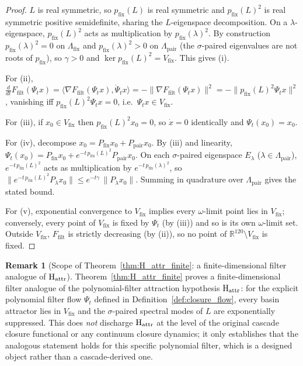 \documentclass[11pt, a4paper]{amsart}
\theoremstyle{definition}
\newtheorem{remark}[theorem]{Remark}
\newcommand{\R}{\mathbb{R}}
\begin{document}
\begin{proof}
$L$ is real symmetric, so $p_{\mathrm{fix}}(L)$ is real symmetric and
$p_{\mathrm{fix}}(L)^2$ is real symmetric positive semidefinite,
sharing the $L$-eigenspace decomposition. On a $\lambda$-eigenspace,
$p_{\mathrm{fix}}(L)^2$ acts as multiplication by
$p_{\mathrm{fix}}(\lambda)^2$. By construction
$p_{\mathrm{fix}}(\lambda)^2 = 0$ on $\Lambda_{\mathrm{fix}}$ and
$p_{\mathrm{fix}}(\lambda)^2 > 0$ on $\Lambda_{\mathrm{pair}}$
(the $\sigma$-paired eigenvalues are not roots of $p_{\mathrm{fix}}$),
so $\gamma > 0$ and $\ker p_{\mathrm{fix}}(L)^2 = V_{\mathrm{fix}}$.
This gives (i).

For (ii), $\frac{d}{dt} F_{\mathrm{filt}}(\Psi_t x) = \langle \nabla F_{\mathrm{filt}}(\Psi_t x),
\dot \Psi_t x\rangle = -\|\nabla F_{\mathrm{filt}}(\Psi_t x)\|^2 = -\|p_{\mathrm{fix}}(L)^2
\Psi_t x\|^2$, vanishing iff $p_{\mathrm{fix}}(L)^2 \Psi_t x = 0$,
i.e.\ $\Psi_t x \in V_{\mathrm{fix}}$.

For (iii), if $x_0 \in V_{\mathrm{fix}}$ then
$p_{\mathrm{fix}}(L)^2 x_0 = 0$, so $\dot x = 0$ identically and
$\Psi_t(x_0) = x_0$.

For (iv), decompose $x_0 = P_{\mathrm{fix}} x_0 + P_{\mathrm{pair}} x_0$.
By (iii) and linearity,
$\Psi_t(x_0) = P_{\mathrm{fix}} x_0 + e^{-t\,p_{\mathrm{fix}}(L)^2}
P_{\mathrm{pair}} x_0$. On each $\sigma$-paired eigenspace
$E_\lambda$ ($\lambda\in\Lambda_{\mathrm{pair}}$),
$e^{-t\,p_{\mathrm{fix}}(L)^2}$ acts as multiplication by
$e^{-t\,p_{\mathrm{fix}}(\lambda)^2}$, so
$\|e^{-t\,p_{\mathrm{fix}}(L)^2} P_\lambda x_0\| \le
e^{-t\gamma}\,\|P_\lambda x_0\|$. Summing in quadrature over
$\Lambda_{\mathrm{pair}}$ gives the stated bound.

For (v), exponential convergence to $V_{\mathrm{fix}}$ implies every
$\omega$-limit point lies in $V_{\mathrm{fix}}$; conversely, every
point of $V_{\mathrm{fix}}$ is fixed by $\Psi_t$ (by (iii)) and so
is its own $\omega$-limit set. Outside $V_{\mathrm{fix}}$, $F_{\mathrm{filt}}$ is
strictly decreasing (by (ii)), so no point of
$\R^{120}\setminus V_{\mathrm{fix}}$ is fixed.
\end{proof}

\begin{remark}[Scope of Theorem~\ref{thm:H_attr_finite}: a finite-dimensional filter analogue of $\textup{H}_{\mathrm{attr}}$]\label{rmk:H_attr_discrete}
Theorem~\ref{thm:H_attr_finite} proves a finite-dimensional filter
analogue of the polynomial-filter attraction hypothesis
$\textup{H}_{\mathrm{attr}}$: for the explicit polynomial filter
flow $\Psi_t$ defined in Definition~\ref{def:closure_flow}, every
basin attractor lies in $V_{\mathrm{fix}}$ and the $\sigma$-paired
spectral modes of $L$ are exponentially suppressed.  This does
\emph{not} discharge $\textup{H}_{\mathrm{attr}}$ at the level of
the original cascade closure functional or any continuum closure
dynamics; it only establishes that the analogous statement holds
for this specific polynomial filter, which is a designed object
rather than a cascade-derived one.
\end{remark}
\end{document}
